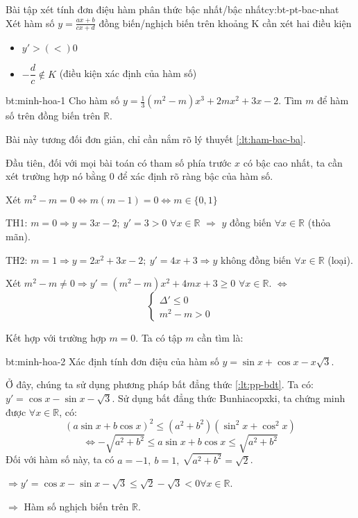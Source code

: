 \begin{chuy}{Bài tập xét tính đơn điệu hàm phân thức bậc nhất/bậc nhất}{cy:bt-pt-bac-nhat}
Xét hàm số $y = \frac{ax + b}{cx +d}$ đồng biến/nghịch biến trên khoảng K cần xét hai điều kiện
\begin{itemize}
    \item $y'> (<) 0$
    \item $-\dfrac{d}{c} \notin K$ \quad (điều kiện xác định của hàm số)
\end{itemize}
\end{chuy}

\begin{cauhoi}{bt:minh-hoa-1}
    Cho hàm số $y = \frac{1}{3}(m^2-m)x^3 + 2mx^2 + 3x -2$.
    Tìm $m$ để hàm số trên đồng biến trên $\mathbb{R}$.
\end{cauhoi}

\begin{loigiai}
    Bài này tương đối đơn giản, chỉ cần nắm rõ lý thuyết \ref{:lt:ham-bac-ba}.

    Đầu tiên, đối với mọi bài toán có tham số phía trước $x$ có bậc cao nhất, ta cần xét trường hợp nó bằng $0$ để xác định rõ ràng bậc của hàm số.

    Xét $m^2 - m = 0 \Leftrightarrow m(m-1) = 0 \Leftrightarrow m \in \{0, 1\}$

    TH1: $m = 0 \Rightarrow y = 3x -2;\ y'=3 > 0$ $\forall x \in \mathbb{R}$ $\Rightarrow$ $y$ đồng biến $\forall x \in \mathbb{R}$ (thỏa mãn).
    
    TH2: $m = 1 \Rightarrow y = 2x^2 + 3x -2;\ y' = 4x + 3 \Rightarrow y$ không đồng biến $\forall x \in \mathbb{R}$ (loại).
    
    Xét $m^2-m \neq 0 \Rightarrow y' = (m^2-m)x^2 + 4mx + 3 \geq 0$ $\forall x \in \mathbb{R}$.
    $\Leftrightarrow$
    \[
    \left\{
    \begin{array}{l}
        \Delta' \leq 0 \\
        m^2-m>0
    \end{array}
    \right.
    \]
    
    Kết hợp với trường hợp $m = 0$. Ta có tập $m$ cần tìm là:
\end{loigiai}

\begin{cauhoi}{bt:minh-hoa-2}
    Xác định tính đơn điệu của hàm số $y = \sin x + \cos x - x\sqrt{3}$.
\end{cauhoi}

\begin{loigiai}
    Ở đây, chúng ta sử dụng phương pháp bất đẳng thức \ref{:lt:pp-bdt}.
    Ta có: $y' = \cos x - \sin x - \sqrt{3}$.
    Sử dụng bất đẳng thức Bunhiacopxki, ta chứng minh được $\forall x \in \mathbb{R}$, có:
    \[
    (a\sin x + b\cos x)^2 \leq (a^2 + b^2)(\sin^2 x + \cos^2 x)
    \]
    \[
    \Leftrightarrow -\sqrt{a^2+b^2} \leq a\sin x + b\cos x \leq \sqrt{a^2+b^2}
    \]
    Đối với hàm số này, ta có $a = -1,\ b = 1,\ \sqrt{a^2 + b^2} = \sqrt{2}$.

    $\Rightarrow y' = \cos x - \sin x - \sqrt{3} \leq \sqrt{2} - \sqrt{3} < 0 \forall x \in \mathbb{R}$.

    $\Rightarrow$ Hàm số nghịch biến trên $\mathbb{R}$.
\end{loigiai}

